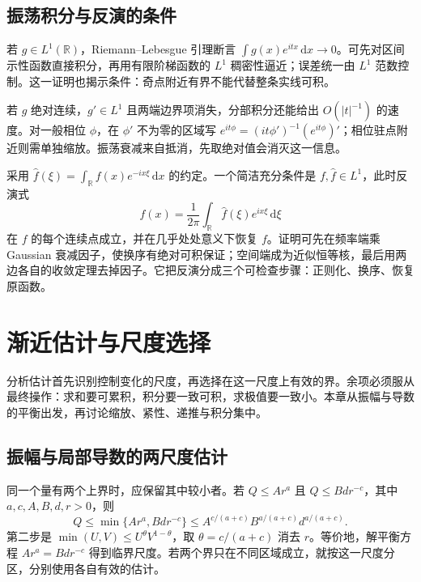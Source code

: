\documentclass[UTF8,12pt,a4paper,fontset=fandol]{ctexart}
\begin{document}
\subsection{振荡积分与反演的条件}

\label{app:integration-inversion}

若 $g\in L^1(\mathbb R)$，Riemann--Lebesgue 引理断言 $\int g(x)e^{itx}\,\mathrm dx\to0$。可先对区间示性函数直接积分，再用有限阶梯函数的 $L^1$ 稠密性逼近；误差统一由 $L^1$ 范数控制。这一证明也揭示条件：奇点附近有界不能代替整条实线可积。

若 $g$ 绝对连续，$g'\in L^1$ 且两端边界项消失，分部积分还能给出 $O(|t|^{-1})$ 的速度。对一般相位 $\phi$，在 $\phi'$ 不为零的区域写 $e^{it\phi}=(it\phi')^{-1}(e^{it\phi})'$；相位驻点附近则需单独缩放。振荡衰减来自抵消，先取绝对值会消灭这一信息。

采用 $\widehat f(\xi)=\int_{\mathbb R}f(x)e^{-ix\xi}\,\mathrm dx$ 的约定。一个简洁充分条件是 $f,\widehat f\in L^1$，此时反演式
\[
f(x)=\frac1{2\pi}\int_{\mathbb R}\widehat f(\xi)e^{ix\xi}\,\mathrm d\xi
\]
在 $f$ 的每个连续点成立，并在几乎处处意义下恢复 $f$。证明可先在频率端乘 Gaussian 衰减因子，使换序有绝对可积保证；空间端成为近似恒等核，最后用两边各自的收敛定理去掉因子。它把反演分成三个可检查步骤：正则化、换序、恢复原函数。



\section{渐近估计与尺度选择}

\label{app:estimates}

分析估计首先识别控制变化的尺度，再选择在这一尺度上有效的界。余项必须服从最终操作：求和要可累积，积分要一致可积，求极值要一致小。本章从振幅与导数的平衡出发，再讨论缩放、紧性、递推与积分集中。

\subsection{振幅与局部导数的两尺度估计}

\label{app:estimate-holder}

同一个量有两个上界时，应保留其中较小者。若 $Q\le A r^a$ 且 $Q\le B d r^{-c}$，其中 $a,c,A,B,d,r>0$，则
\[
Q\le\min\{A r^a,Bd r^{-c}\}
\le A^{c/(a+c)}B^{a/(a+c)}d^{a/(a+c)}.
\]
第二步是 $\min(U,V)\le U^\theta V^{1-\theta}$，取 $\theta=c/(a+c)$ 消去 $r$。等价地，解平衡方程 $A r^a=Bd r^{-c}$ 得到临界尺度。若两个界只在不同区域成立，就按这一尺度分区，分别使用各自有效的估计。
\end{document}
